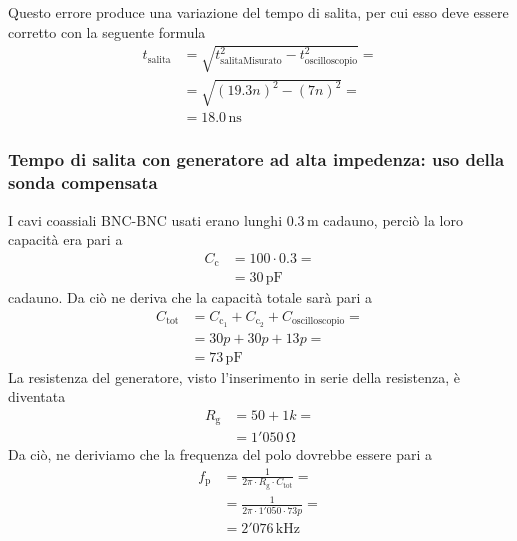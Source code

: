 \documentclass{article}
\begin{document}
				Questo errore produce una variazione del tempo di salita, per cui esso deve essere corretto con la seguente formula
				\begin{equation*}
					\begin{split}
						t_{\mathrm{salita}} &= \sqrt{t_{\mathrm{salitaMisurato}}^{2} - t_{\mathrm{oscilloscopio}}^{2}} = \\
											&= \sqrt{(19.3n)^{2} - (7n)^{2}} = \\
											&= 18.0 \, \mathrm{ns}
					\end{split}
				\end{equation*}
			\subsubsection{Tempo di salita con generatore ad alta impedenza: uso della sonda compensata}
				I cavi coassiali BNC-BNC usati erano lunghi $ 0.3 \, \mathrm{m} $ cadauno, perciò la loro capacità era pari a
				\begin{equation*}
					\begin{split}
						C_{\mathrm{c}} &= 100 \cdot 0.3 = \\
									   &= 30 \, \mathrm{pF}
					\end{split}
				\end{equation*}
				cadauno. Da ciò ne deriva che la capacità totale sarà pari a
				\begin{equation*}
					\begin{split}
						C_{\mathrm{tot}} &= C_{\mathrm{c_{1}}} + C_{\mathrm{c_{2}}} + C_{\mathrm{oscilloscopio}} = \\
										 &= 30p + 30p + 13p =\\
										 &= 73 \, \mathrm{pF}
					\end{split}
				\end{equation*}
				La resistenza del generatore, visto l'inserimento in serie della resistenza, è diventata
				\begin{equation*}
					\begin{split}
						R_{\mathrm{g}} &= 50 + 1k = \\
									   &= 1'050 \, \mathrm{\Omega}
					\end{split}
				\end{equation*}
				Da ciò, ne deriviamo che la frequenza del polo dovrebbe essere pari a
				\begin{equation*}
					\begin{split}
						f_{\mathrm{p}} &= \frac{1}{2 \pi \cdot R_{\mathrm{g}} \cdot C_{\mathrm{tot}}} = \\
									   &= \frac{1}{2 \pi \cdot 1'050 \cdot 73p} = \\
									   &= 2'076 \, \mathrm{kHz}
					\end{split}
				\end{equation*}
\end{document}
